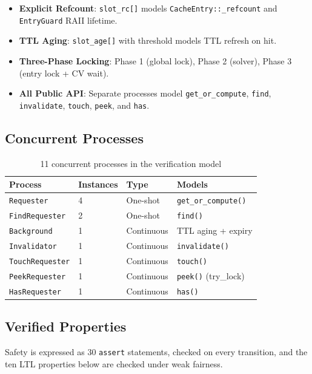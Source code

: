 \documentclass[11pt,a4paper]{article}
\begin{document}
\begin{itemize}
\item \textbf{Explicit Refcount}: \texttt{slot\_rc[]} models \texttt{CacheEntry::\_refcount}
      and \texttt{EntryGuard} RAII lifetime.
\item \textbf{TTL Aging}: \texttt{slot\_age[]} with threshold models TTL refresh on hit.
\item \textbf{Three-Phase Locking}: Phase 1 (global lock), Phase 2 (solver), 
      Phase 3 (entry lock + CV wait).
\item \textbf{All Public API}: Separate processes model \texttt{get\_or\_compute},
      \texttt{find}, \texttt{invalidate}, \texttt{touch}, \texttt{peek}, and \texttt{has}.
\end{itemize}

\subsection{Concurrent Processes}

\begin{table}[htbp]
\centering
\begin{tabular}{@{}llll@{}}
\toprule
Process & Instances & Type & Models \\
\midrule
\texttt{Requester} & 4 & One-shot & \texttt{get\_or\_compute()} \\
\texttt{FindRequester} & 2 & One-shot & \texttt{find()} \\
\texttt{Background} & 1 & Continuous & TTL aging + expiry \\
\texttt{Invalidator} & 1 & Continuous & \texttt{invalidate()} \\
\texttt{TouchRequester} & 1 & Continuous & \texttt{touch()} \\
\texttt{PeekRequester} & 1 & Continuous & \texttt{peek()} (try\_lock) \\
\texttt{HasRequester} & 1 & Continuous & \texttt{has()} \\
\bottomrule
\end{tabular}
\caption{11 concurrent processes in the verification model}
\end{table}

\subsection{Verified Properties}

Safety is expressed as 30 \texttt{assert} statements, checked on every
transition, and the ten LTL properties below are checked under weak fairness.
\end{document}

